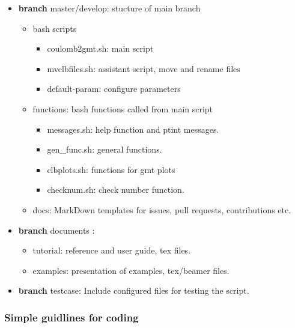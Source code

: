\begin{itemize}

\item
  \textbf{branch} master/develop: stucture of main branch

  \begin{itemize}
  
  \item
    bash scripts

    \begin{itemize}
    
    \item
      coulomb2gmt.sh: main script
    \item
      mvclbfiles.sh: assistant script, move and rename files
    \item
      default-param: configure parameters
    \end{itemize}
  \item
    functions: bash functions called from main script

    \begin{itemize}
    
    \item
      messages.sh: help function and ptint messages.
    \item
      gen\_func.sh: general functions.
    \item
      clbplots.sh: functions for gmt plots
    \item
      checknum.sh: check number function.
    \end{itemize}
  \item
    docs: MarkDown templates for issues, pull requests, contributions
    etc.
  \end{itemize}
\item
  \textbf{branch} documents :

  \begin{itemize}
  
  \item
    tutorial: reference and user guide, tex files.
  \item
    examples: presentation of examples, tex/beamer files.
  \end{itemize}
\item
  \textbf{branch} testcase: Include configured files for testing the
  script.
\end{itemize}

\subsubsection{Simple guidlines for
coding}\label{simple-guidances-for-coding}

